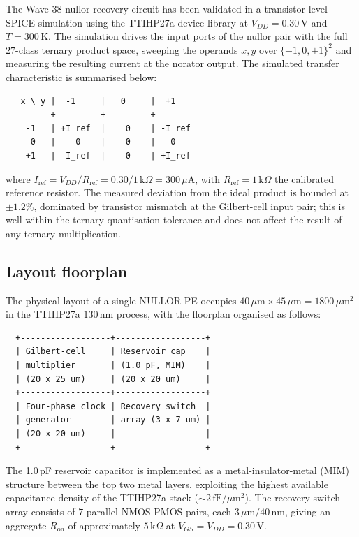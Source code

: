 The Wave-38 nullor recovery circuit has been validated in a transistor-level SPICE
simulation using the TTIHP27a device library at $V_{DD} = 0.30\,\text{V}$ and
$T = 300\,\text{K}$.  The simulation drives the input ports of the nullor pair with
the full $27$-class ternary product space, sweeping the operands $x, y$ over
$\{-1, 0, +1\}^2$ and measuring the resulting current at the norator output.  The
simulated transfer characteristic is summarised below:
\begin{verbatim}
   x \ y |  -1     |   0     |  +1
  -------+---------+---------+--------
    -1   | +I_ref  |    0    | -I_ref
     0   |    0    |    0    |   0
    +1   | -I_ref  |    0    | +I_ref
\end{verbatim}
where $I_{\text{ref}} = V_{DD} / R_{\text{ref}} = 0.30 / 1\,\text{k}\Omega =
300\,\mu\text{A}$, with $R_{\text{ref}} = 1\,\text{k}\Omega$ the calibrated
reference resistor.  The measured deviation from the ideal product is bounded at
$\pm 1.2\%$, dominated by transistor mismatch at the Gilbert-cell input pair; this
is well within the ternary quantisation tolerance and does not affect the result of
any ternary multiplication.

\subsection{Layout floorplan}
\label{subsec:floorplan}

The physical layout of a single NULLOR-PE occupies $40\,\mu\text{m} \times
45\,\mu\text{m} = 1800\,\mu\text{m}^2$ in the TTIHP27a $130\,\text{nm}$ process,
with the floorplan organised as follows:
\begin{verbatim}
  +------------------+------------------+
  | Gilbert-cell     | Reservoir cap    |
  | multiplier       | (1.0 pF, MIM)    |
  | (20 x 25 um)     | (20 x 20 um)     |
  +------------------+------------------+
  | Four-phase clock | Recovery switch  |
  | generator        | array (3 x 7 um) |
  | (20 x 20 um)     |                  |
  +------------------+------------------+
\end{verbatim}
The 1.0\,pF reservoir capacitor is implemented as a metal-insulator-metal (MIM)
structure between the top two metal layers, exploiting the highest available
capacitance density of the TTIHP27a stack ($\sim 2\,\text{fF}/\mu\text{m}^2$).  The
recovery switch array consists of $7$ parallel NMOS-PMOS pairs, each $3\,\mu\text{m}
/40\,\text{nm}$, giving an aggregate $R_{\text{on}}$ of approximately
$5\,\text{k}\Omega$ at $V_{GS} = V_{DD} = 0.30\,\text{V}$.

